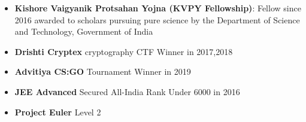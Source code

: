 \begin{itemize}
    \item[\circ] \textbf{Kishore Vaigyanik Protsahan Yojna (KVPY Fellowship)}: Fellow since 2016 
    awarded to scholars pursuing pure science by the Department of Science and Technology, Government of India
    \item[\circ] \textbf{Drishti Cryptex} cryptography CTF Winner in 2017,2018
    
    \item[\circ] \textbf{Advitiya CS:GO} Tournament Winner in 2019
    
    
    \item[\circ] \textbf{JEE Advanced} Secured All-India Rank Under 6000 in 2016 
    \item[\circ] \textbf{Project Euler} Level 2
  \end{itemize}